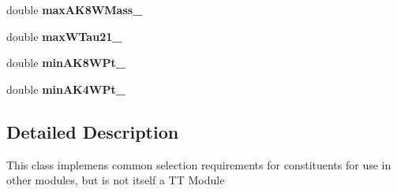 \begin{DoxyCompactItemize}
\item 
\hypertarget{classTTMConstituentReqs_a79fe4f3ece12c5dc280793becb71b8b2}{double {\bfseries max\-A\-K8\-W\-Mass\-\_\-}}\label{classTTMConstituentReqs_a79fe4f3ece12c5dc280793becb71b8b2}

\item 
\hypertarget{classTTMConstituentReqs_ac4475ca59a99f5a3b54390413e7aa87e}{double {\bfseries max\-W\-Tau21\-\_\-}}\label{classTTMConstituentReqs_ac4475ca59a99f5a3b54390413e7aa87e}

\item 
\hypertarget{classTTMConstituentReqs_aad794bd881baebbbbb83f7042e291999}{double {\bfseries min\-A\-K8\-W\-Pt\-\_\-}}\label{classTTMConstituentReqs_aad794bd881baebbbbb83f7042e291999}

\item 
\hypertarget{classTTMConstituentReqs_a40ece9d7d687f58842ebe8ad70bb47fa}{double {\bfseries min\-A\-K4\-W\-Pt\-\_\-}}\label{classTTMConstituentReqs_a40ece9d7d687f58842ebe8ad70bb47fa}

\end{DoxyCompactItemize}


\subsection{Detailed Description}
This class implemens common selection requirements for constituents for use in other modules, but is not itself a T\-T Module


